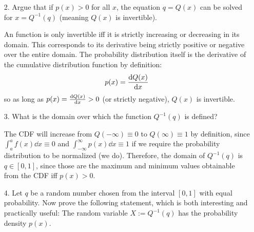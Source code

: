 \documentclass[a4paper,twoside]{article}
\begin{document}
\begin{itemize}
\begin{figure}[h]
        \end{figure}
    \item[2.] Argue that if $ p(x) > 0 $ for all $ x $, the equation $ q = Q(x) $ can be solved for $ x = Q^{-1}(q) $ (meaning $ Q(x) $ is invertible).
        \begin{problem}
            An function is only invertible iff it is strictly increasing or decreasing in its domain. This corresponds to its derivative being strictly positive or negative over the entire domain. The probability distribution itself is the derivative of the cumulative distribution function by definition:
            \begin{equation}
                p(x) = \dv{Q(x)}{x}
            \end{equation}
            so as long as $ p(x) = \dv{Q(x)}{x} > 0 $ (or strictly negative), $ Q(x) $ is invertible.
        \end{problem}
    \item[3.] What is the domain over which the function $ Q^{-1}(q) $ is defined?
        \begin{problem}
            The CDF will increase from $ Q(- \infty) \equiv 0 $ to $ Q(\infty) \equiv 1 $ by definition, since $ \int_{a}^{a} f(x) \dd{x} \equiv 0 $ and $ \int_{- \infty}^{\infty} p(x) \dd{x} \equiv 1 $ if we require the probability distribution to be normalized (we do). Therefore, the domain of $ Q^{-1}(q) $ is $ q \in [0,1] $, since those are the maximum and minimum values obtainable from the CDF iff $ p(x) > 0 $.
        \end{problem}
    \item[4.] Let $ q $ be a random number chosen from the interval $ [0,1] $ with equal probability. Now prove the following statement, which is both interesting and practically useful: The random variable $ X := Q^{-1}(q) $ has the probability density $ p(x) $.


\end{itemize}
\end{document}
